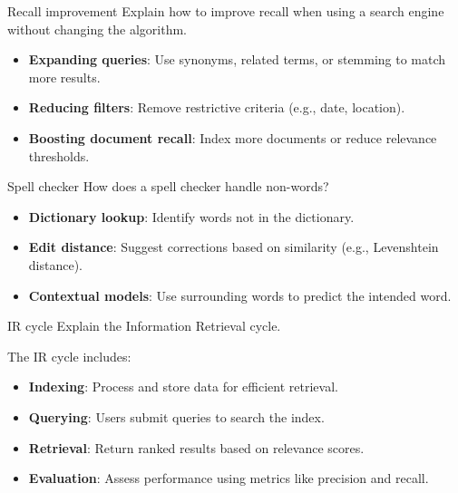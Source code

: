 \documentclass{article}
\begin{document}
\begin{exercise}{Recall improvement}
  Explain how to improve recall when using a search engine without changing the algorithm.

  \begin{solution}
    \begin{itemize}
        \item \textbf{Expanding queries}: Use synonyms, related terms, or stemming to match more results.
        \item \textbf{Reducing filters}: Remove restrictive criteria (e.g., date, location).
        \item \textbf{Boosting document recall}: Index more documents or reduce relevance thresholds.
    \end{itemize}
  \end{solution}
\end{exercise}

\begin{exercise}{Spell checker}
  How does a spell checker handle non-words?

  \begin{solution}
    \begin{itemize}
        \item \textbf{Dictionary lookup}: Identify words not in the dictionary.
        \item \textbf{Edit distance}: Suggest corrections based on similarity (e.g., Levenshtein distance).
        \item \textbf{Contextual models}: Use surrounding words to predict the intended word.
    \end{itemize}
  \end{solution}
\end{exercise}

\begin{exercise}{IR cycle}
  Explain the Information Retrieval cycle.

  \begin{solution}
    The IR cycle includes:
    \begin{itemize}
        \item \textbf{Indexing}: Process and store data for efficient retrieval.
        \item \textbf{Querying}: Users submit queries to search the index.
        \item \textbf{Retrieval}: Return ranked results based on relevance scores.
        \item \textbf{Evaluation}: Assess performance using metrics like precision and recall.
    \end{itemize}
  \end{solution}
\end{exercise}
\end{document}
